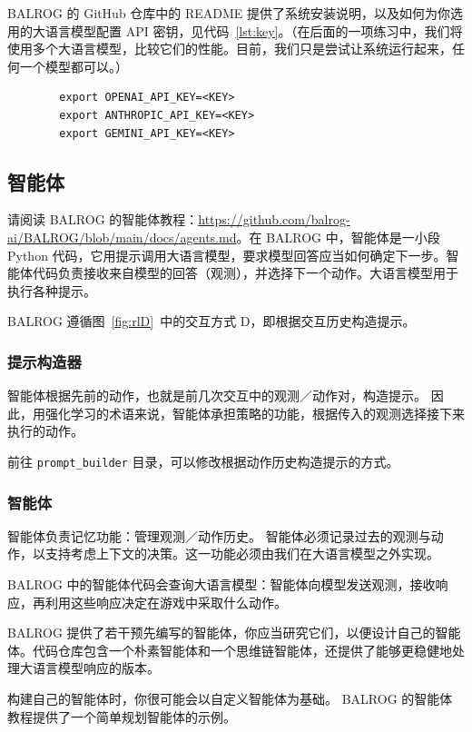 BALROG 的 GitHub 仓库中的 README 提供了系统安装说明，以及如何为你选用的大语言模型配置 API 密钥，见代码~\ref{lst:key}。（在后面的一项练习中，我们将使用多个大语言模型，比较它们的性能。目前，我们只是尝试让系统运行起来，任何一个模型都可以。）
\begin{listing}
    \begin{verbatim}
        export OPENAI_API_KEY=<KEY>
        export ANTHROPIC_API_KEY=<KEY>
        export GEMINI_API_KEY=<KEY>
    \end{verbatim}
    \caption{配置 API 密钥。}\label{lst:key}
\end{listing}

\subsection{智能体}
请阅读 BALROG 的智能体教程：\url{https://github.com/balrog-ai/BALROG/blob/main/docs/agents.md}。在 BALROG 中，智能体是一小段 Python 代码，它用提示调用大语言模型，要求模型回答应当如何确定下一步。智能体代码负责接收来自模型的回答（观测），并选择下一个动作。大语言模型用于执行各种提示。

BALROG 遵循图~\ref{fig:rlD}~中的交互方式 D，即根据交互历史构造提示。

\subsubsection{提示构造器}
智能体根据先前的动作，也就是前几次交互中的观测／动作对，构造提示。
因此，用强化学习的术语来说，智能体承担策略的功能，根据传入的观测选择接下来执行的动作。

前往 \verb|prompt_builder| 目录，可以修改根据动作历史构造提示的方式。

\subsubsection{智能体}
智能体负责记忆功能：管理观测／动作历史。
智能体必须记录过去的观测与动作，以支持考虑上下文的决策。这一功能必须由我们在大语言模型之外实现。

BALROG 中的智能体代码会查询大语言模型：智能体向模型发送观测，接收响应，再利用这些响应决定在游戏中采取什么动作。

BALROG 提供了若干预先编写的智能体，你应当研究它们，以便设计自己的智能体。代码仓库包含一个朴素智能体和一个思维链智能体，还提供了能够更稳健地处理大语言模型响应的版本。

构建自己的智能体时，你很可能会以自定义智能体为基础。
BALROG 的智能体教程提供了一个简单规划智能体的示例。

